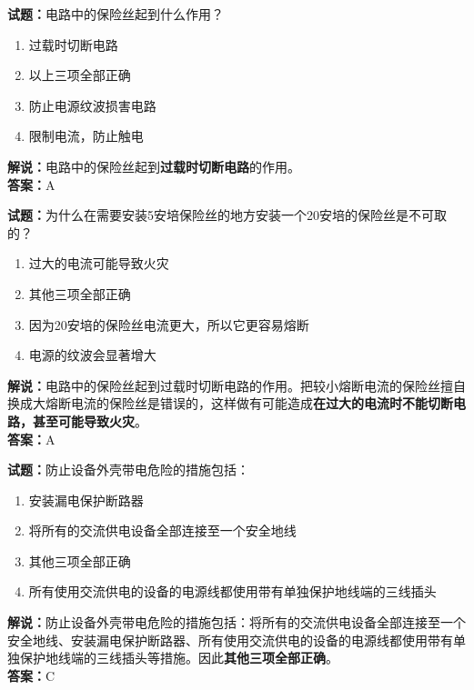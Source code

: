 \documentclass{ctexbook}
\begin{document}
\bigskip



\noindent\textbf{试题：}电路中的保险丝起到什么作用？
\begin{enumerate}[leftmargin=3em]
	\item 过载时切断电路
	\item 以上三项全部正确
	\item 防止电源纹波损害电路
	\item 限制电流，防止触电
\end{enumerate}
\noindent\textbf{解说：}电路中的保险丝起到\textbf{过载时切断电路}的作用。\\\noindent\textbf{答案：}A


\bigskip



\noindent\textbf{试题：}为什么在需要安装5安培保险丝的地方安装一个20安培的保险丝是不可取的？
\begin{enumerate}[leftmargin=3em]
	\item 过大的电流可能导致火灾
	\item 其他三项全部正确
	\item 因为20安培的保险丝电流更大，所以它更容易熔断
	\item 电源的纹波会显著增大
\end{enumerate}
\noindent\textbf{解说：}电路中的保险丝起到过载时切断电路的作用。把较小熔断电流的保险丝擅自换成大熔断电流的保险丝是错误的，这样做有可能造成\textbf{在过大的电流时不能切断电路，甚至可能导致火灾}。\\\noindent\textbf{答案：}A


\bigskip



\noindent\textbf{试题：}防止设备外壳带电危险的措施包括：
\begin{enumerate}[leftmargin=3em]
	\item 安装漏电保护断路器
	\item 将所有的交流供电设备全部连接至一个安全地线
	\item 其他三项全部正确
	\item 所有使用交流供电的设备的电源线都使用带有单独保护地线端的三线插头
\end{enumerate}
\noindent\textbf{解说：}防止设备外壳带电危险的措施包括：将所有的交流供电设备全部连接至一个安全地线、安装漏电保护断路器、所有使用交流供电的设备的电源线都使用带有单独保护地线端的三线插头等措施。因此\textbf{其他三项全部正确}。\\\noindent\textbf{答案：}C


\bigskip
\end{document}
